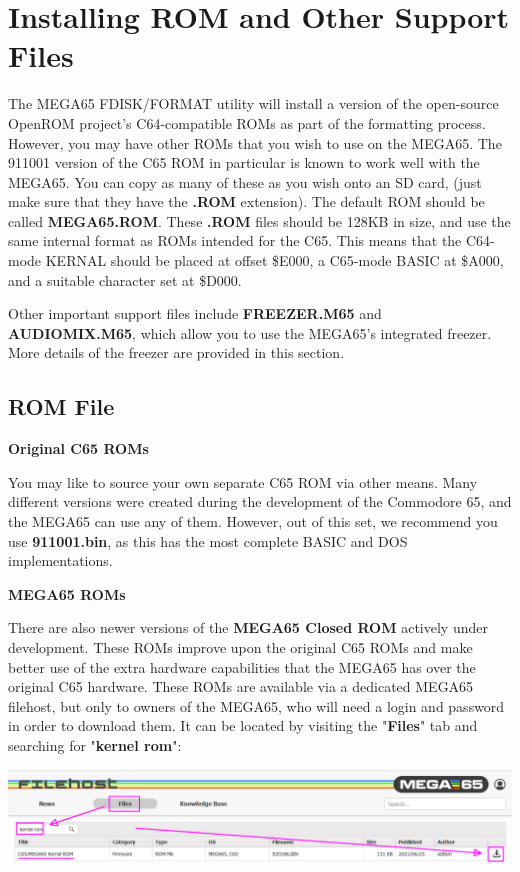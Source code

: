 \section{Installing ROM and Other Support Files}
\label{sec:installingrometc}

The MEGA65 FDISK/FORMAT utility will install a version of the
open-source OpenROM project's C64-compatible ROMs as part of the
formatting process. However, you may have other ROMs that you wish to
use on the MEGA65. The 911001 version of the C65 ROM in
particular is known to work well with the MEGA65.
You can copy as many of these as you wish onto an
SD card, (just make sure that they have the \textbf{.ROM} extension). The default ROM
should be called \textbf{MEGA65.ROM}. These \textbf{.ROM} files
should be 128KB in size, and use the same internal format as ROMs
intended for the C65.  This means that the C64-mode KERNAL should be
placed at offset \$E000, a C65-mode BASIC at \$A000, and a suitable
character set at \$D000.  

Other important support files include \textbf{FREEZER.M65} and \textbf{AUDIOMIX.M65}, which
allow you to use the MEGA65's integrated freezer. More details of the freezer are provided in this section.

\subsection{ROM File}

\textbf{Original C65 ROMs}

You may like to source your own separate C65 ROM via other means. Many different versions were created during the development of the Commodore 65,
and the MEGA65 can use any of them. However, out of this set, we recommend you use \textbf{911001.bin}, as this has the most complete BASIC and DOS implementations.

\textbf{MEGA65 ROMs}

There are also newer versions of the \textbf{MEGA65 Closed ROM} actively under development. These ROMs improve upon the original C65 ROMs and make better use of the extra hardware capabilities that the MEGA65 has over the original C65 hardware. These ROMs are available via a dedicated MEGA65 filehost, but only to owners of the MEGA65, who will need a login and password in order to download them. It can be located by visiting the "\textbf{Files}" tab and searching for "\textbf{kernel rom}":

\includegraphics[width=\linewidth]{images/latest_closed_rom.png}

